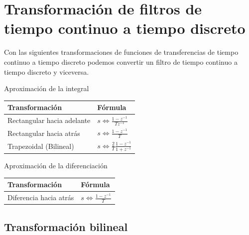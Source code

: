 \documentclass[11pt,a4paper,openany]{book}
\begin{document}
\section{Transformaci\'{o}n de filtros de tiempo continuo a tiempo discreto}

Con las siguientes transformaciones de funciones de transferencias de tiempo continuo a tiempo discreto podemos convertir un filtro de tiempo continuo a tiempo discreto y viceversa.

\begin{center}
	Aproximaci\'{o}n de la integral \\ \vspace{0.2cm}
	\renewcommand{\arraystretch}{1.8}
	\begin{tabular}{ll}
		\textbf{Transformaci\'{o}n} & \textbf{F\'{o}rmula} \\ \hline
		Rectangular hacia adelante & $s \Leftrightarrow \frac{1-z^{-1}}{Tz^{-1}}$ \label{adelante} \\
		Rectangular hacia atr\'{a}s & $s \Leftrightarrow \frac{1-z^{-1}}{T}$ \label{atras}\\
		Trapezoidal (Bilineal) & $s \Leftrightarrow \frac{2}{T}\frac{1-z^{-1}}{1+z^{-1}}$ \label{trapezoidal}
	\end{tabular}
\end{center}

\vspace{0.5cm}

\begin{center}
	Aproximaci\'{o}n de la diferenciaci\'{o}n \\ \vspace{0.2cm}
	\renewcommand{\arraystretch}{1.8}
	\begin{tabular}{ll}
		\textbf{Transformaci\'{o}n} & \textbf{F\'{o}rmula} \\ \hline
		Diferencia hacia atr\'{a}s & $s \Leftrightarrow \frac{1-z^{-1}}{T}$
	\end{tabular}
\end{center}

\subsection{Transformaci\'{o}n bilineal}
\end{document}
